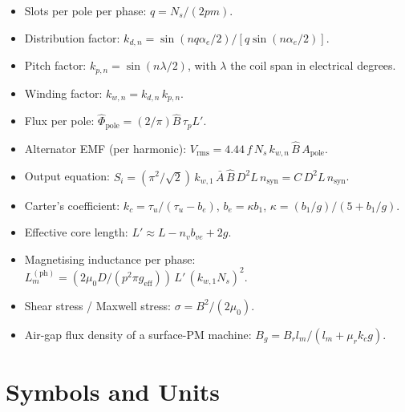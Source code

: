 \documentclass[12pt,a4paper]{article}
\begin{document}
\begin{itemize}[noitemsep]
  \item Slots per pole per phase: $q = N_s/(2pm)$.
  \item Distribution factor:
        $k_{d,n} = \sin(nq\alpha_e/2)/[q\sin(n\alpha_e/2)]$.
  \item Pitch factor: $k_{p,n} = \sin(n\lambda/2)$, with $\lambda$ the
        coil span in electrical degrees.
  \item Winding factor: $k_{w,n} = k_{d,n}\,k_{p,n}$.
  \item Flux per pole: $\hat\Phi_\text{pole} = (2/\pi)\hat B\,\tau_p L'$.
  \item Alternator EMF (per harmonic): $V_\text{rms} = 4.44\,f\,N_s\,k_{w,n}\,\hat B\,A_\text{pole}$.
  \item Output equation: $S_i = (\pi^2/\sqrt{2})\,k_{w,1}\,\bar A\,\hat B\,D^2 L\,n_\text{syn}
                              = C\,D^2 L\,n_\text{syn}$.
  \item Carter's coefficient: $k_c = \tau_u/(\tau_u-b_e)$,
        $b_e = \kappa b_1$, $\kappa = (b_1/g)/(5+b_1/g)$.
  \item Effective core length: $L' \approx L - n_v b_{ve} + 2g$.
  \item Magnetising inductance per phase:
        $L_m^{(\text{ph})} = (2\mu_0 D/(p^2\pi g_\text{eff}))\,L'\,(k_{w,1}N_s)^2$.
  \item Shear stress / Maxwell stress: $\sigma = B^2/(2\mu_0)$.
  \item Air-gap flux density of a surface-PM machine:
        $B_g = B_r l_m/(l_m + \mu_r k_c g)$.
\end{itemize}

\section{Symbols and Units}
\end{document}
